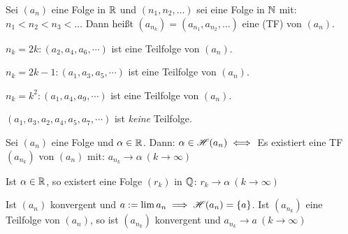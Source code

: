 \documentclass[a4paper,twoside,DIV15,BCOR12mm]{scrbook}
\begin{document}
\begin{definition}[Teilfolge]
Sei $(a_n)$ eine Folge in $\mathbb{R}$ und $(n_1,n_2,\ldots)$ sei eine Folge in $\mathbb{N}$ mit: $n_1<n_2<n_3<\ldots$ Dann heißt $(a_{n_k}) = (a_{n_1}, a_{n_2},\ldots)$ eine  (TF) von $(a_n)$.
\end{definition}

\begin{beispiele}
\item $n_k=2k: (a_2, a_4, a_6, \cdots)$ ist eine Teilfolge von $(a_n)$.
\item $n_k=2k-1: (a_1, a_3, a_5, \cdots)$ ist eine Teilfolge von $(a_n)$.
\item $n_k=k^2: (a_1, a_4, a_9, \cdots)$ ist eine Teilfolge von $(a_n)$.
\item $(a_1, a_3, a_2, a_4, a_5, a_7, \cdots)$ ist \emph{keine} Teilfolge.
\end{beispiele}

\begin{satz}
\begin{liste}
\item Sei $(a_n)$ eine Folge und $\alpha \in\mathbb{R}$. Dann: $\alpha \in \mathscr{H}(a_n) \iff$ Es existiert eine TF $(a_{n_k})$ von $(a_n)$ mit: $a_{n_k} \to \alpha\ (k \to \infty)$
\item Ist $\alpha \in \mathbb{R}$, so existert eine Folge $(r_k)$ in $\mathbb{Q}$: $r_k \to \alpha \ (k\to\infty)$
\item Ist $(a_n)$ konvergent und $a:=\lim a_n \implies \mathscr{H}(a_n) = \{a\}$. Ist $(a_{n_k})$ eine Teilfolge von $(a_n)$, so ist $(a_{n_k})$ konvergent und $a_{n_k} \to a\ (k \to \infty)$
\end{liste}
\end{satz}
\end{document}
